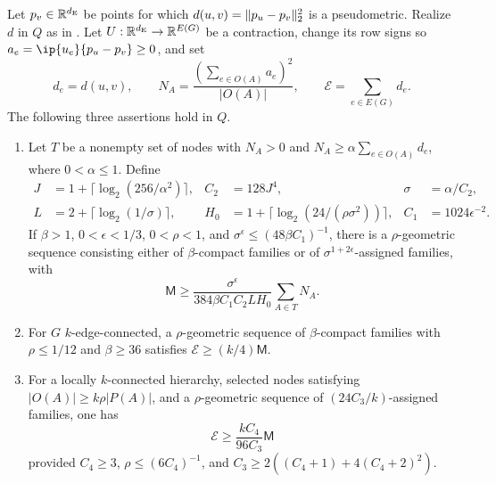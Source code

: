 \begin{lemma}\label{tg:transfer}
Let $p_v\in\mathbb R^{d_{\mathrm E}}$ be points for which
$d(u,v)=\lVert p_u-p_v\rVert_2^2$ is a pseudometric.  Realize $d$ in $Q$
as in .  Let $U:\mathbb R^{d_{\mathrm E}}\to\mathbb R^{E(G)}$ be a
contraction, change its row signs so
$a_e=\ip{u_e}{p_u-p_v}\ge0$, and set
\[
 d_e=d(u,v),\qquad
 N_A=\frac{(\sum_{e\in O(A)}a_e)^2}{|O(A)|},\qquad
 \mathcal E=\sum_{e\in E(G)}d_e.
\]
The following three assertions hold in $Q$.
\begin{enumerate}[label=(\roman*)]
\item\label{tg:transfer-extract}
Let $T$ be a nonempty set of nodes with $N_A>0$ and
$N_A\ge\alpha\sum_{e\in O(A)}d_e$, where $0<\alpha\le1$.
Define
\begin{align*}
 J&=1+\lceil\log_2(256/\alpha^2)\rceil,&
 C_2&=128J^4,&\sigma&=\alpha/C_2,\\
 L&=2+\lceil\log_2(1/\sigma)\rceil,&
 H_0&=1+\lceil\log_2(24/(\rho\sigma^2))\rceil,&
 C_1&=1024\epsilon^{-2}.
\end{align*}
If $\beta>1$, $0<\epsilon<1/3$, $0<\rho<1$, and
$\sigma^\epsilon\le(48\beta C_1)^{-1}$, there is a
$\rho$-geometric sequence consisting either of $\beta$-compact
families or of $\sigma^{1+2\epsilon}$-assigned families, with
\begin{equation}\label{tg:captured-mass}
 \mathsf M\ge
 \frac{\sigma^\epsilon}{384\beta C_1C_2LH_0}
                  \sum_{A\in T}N_A.
\end{equation}
\item\label{tg:transfer-compact}
For $G$ $k$-edge-connected, a $\rho$-geometric sequence of $\beta$-compact families
with $\rho\le1/12$ and $\beta\ge36$ satisfies
$\mathcal E\ge(k/4)\mathsf M$.
\item\label{tg:transfer-assigned}
For a locally $k$-connected hierarchy, selected nodes satisfying
$|O(A)|\ge k\rho|P(A)|$, and a $\rho$-geometric sequence of
$(24C_3/k)$-assigned families, one has
\begin{equation}\label{tg:assigned-charge}
 \mathcal E\ge\frac{kC_4}{96C_3}\mathsf M
\end{equation}
provided
$C_4\ge3$, $\rho\le(6C_4)^{-1}$, and
$C_3\ge2((C_4+1)+4(C_4+2)^2)$.
\end{enumerate}
\end{lemma}

